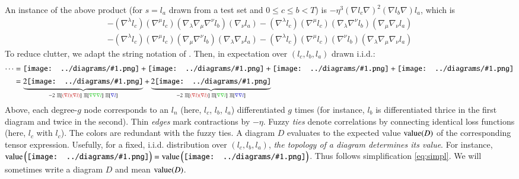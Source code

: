 \documentclass{article}
\newcommand{\dvalue}{\text{\textnormal{value}}}
\newcommand{\expct}[1]{\mathbb{E}\left[#1\right]}
\newcommand{\wrap}[1]{\left(#1\right)}
\newcommand{\sdia}[1]{\begin{gathered}\texttt{[image: ../diagrams/\#1.png]}\end{gathered}}
\begin{document}
        An instance of the above product (for $s=l_a$ drawn from a test set and
        $0\leq c\leq b<T$) is $-\eta^3 (\nabla l_c \nabla)^2 (\nabla l_b
        \nabla) l_a$, which is
        {\small
        \begin{align*}
            - (\nabla^\lambda l_c) (\nabla^\mu l_c) (\nabla_\lambda \nabla_\mu \nabla^\nu l_b) (\nabla_\nu l_a)   
            - (\nabla^\lambda l_c) (\nabla^\mu l_c) (\nabla_\lambda \nabla^\nu l_b) (\nabla_\mu \nabla_\nu l_a) \\
            - (\nabla^\lambda l_c) (\nabla^\mu l_c) (\nabla_\mu \nabla^\nu l_b) (\nabla_\lambda \nabla_\nu l_a)   
            - (\nabla^\lambda l_c) (\nabla^\mu l_c) (\nabla^\nu l_b) (\nabla_\lambda \nabla_\mu \nabla_\nu l_a)
        \end{align*}
        }
        To reduce clutter, we adapt the string notation of \citet{pe71}.  Then,
        in expectation over $(l_c, l_b, l_a)$ drawn i.i.d.:
        \begin{align}
            \cdots
            &= 
                 \sdia{(01-2-3)(02-12-23)}
                +\sdia{(01-2-3)(02-13-23)}
                +\sdia{(01-2-3)(03-12-23)}
                +\sdia{(01-2-3)(03-13-23)} \\
                \label{eq:simpl}
            &=
                \underbrace{2\sdia{(01-2-3)(02-12-23)}}_{
                   -2~\expct{{\color{moor}(\nabla l)(\nabla l)}}~\expct{{\color{moog}\nabla\nabla\nabla l}}~\expct{{\color{moob} \nabla l}}
                }
                +
                \underbrace{2\sdia{(01-2-3)(02-13-23)}}_{
                   -2~\expct{{\color{moor}(\nabla l)(\nabla l)}}~\expct{{\color{moog}\nabla \nabla l}}~\expct{{\color{moob}\nabla \nabla l}}
                }
        \end{align}
        Above, each degree-$g$ node corresponds to an $l_n$ (here,
            {\color{moor} $l_c$},
            {\color{moog} $l_b$},
            {\color{moob} $l_a$}) differentiated $g$ times
        (for instance, {\color{moog} $l_b$} is differentiated thrice in the
        first diagram and twice in the second).  Thin \emph{edges} mark
        contractions by $-\eta$.  Fuzzy \emph{ties} denote correlations by
        connecting identical loss functions (here, {\color{moor} $l_c$} with
        {\color{moor} $l_c$}).  The colors are redundant with the fuzzy ties.
        A diagram $D$ evaluates to the expected value $\dvalue(D)$ of the
        corresponding tensor expression.
        Usefully, for a fixed, i.i.d.  distribution over $(l_c, l_b, l_a)$,
        \emph{the topology of a diagram determines its value}.  For instance,
        $
            \dvalue\wrap{\sdia{(01-2-3)(02-12-23)}}
            =
            \dvalue\wrap{\sdia{(01-2-3)(03-13-23)}}
        $.
        Thus follows simplification \ref{eq:simpl}.
        We will sometimes write a diagram $D$ and mean $\dvalue(D)$. 
    
\end{document}
